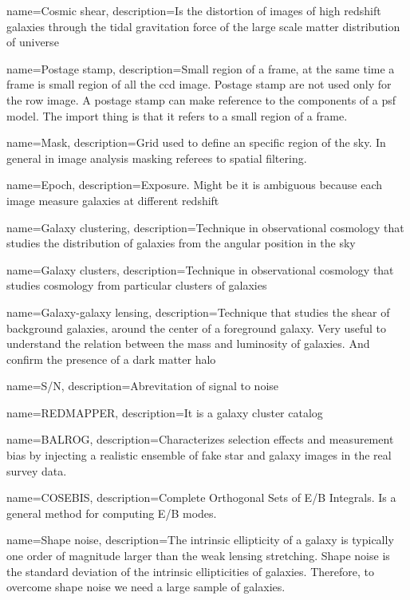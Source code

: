 {
    name=Cosmic shear,
    description={Is the distortion of images of high redshift galaxies through the tidal gravitation force of the large scale matter distribution of universe}
}

{
    name=Postage stamp,
    description={Small region of a frame, at the same time a frame is small region of all the ccd image. Postage stamp are not used only for the row image. A postage stamp can make reference to the components of a psf model. The import thing is that it refers to a small region of a frame.}
}

{
    name=Mask,
    description={Grid used to define an specific region of the sky. In general in image analysis masking referees to spatial filtering. }
}

{
    name=Epoch,
    description={Exposure. Might be it is ambiguous because each image measure galaxies at different redshift }
}

{
    name=Galaxy clustering,
    description={Technique in observational cosmology that studies the distribution of galaxies from the angular position in the sky}
}

{
    name=Galaxy clusters,
    description={Technique in observational cosmology that studies cosmology from particular clusters of galaxies }
}


{
    name=Galaxy-galaxy lensing,
    description={Technique that studies the shear of background galaxies, around the center of a foreground galaxy. Very useful to understand the relation between the mass and luminosity of galaxies. And confirm the presence of a dark matter halo}
}

{
    name=S/N,
    description={Abrevitation of signal to noise }
}

{
    name=REDMAPPER,
    description={It is a galaxy cluster catalog}
}


{
    name=BALROG,
    description={Characterizes selection effects and measurement bias by injecting a realistic ensemble of fake star and galaxy images in the real survey data.}
}

{
    name=COSEBIS,
    description={Complete Orthogonal Sets of E/B Integrals. Is a general method for computing E/B modes. }
}

{
    name=Shape noise,
    description={The intrinsic ellipticity of a galaxy is typically one order of magnitude larger than the weak lensing stretching. Shape noise is the standard deviation of the intrinsic ellipticities of galaxies. Therefore, to overcome shape noise we need a large sample of galaxies.  }
}

